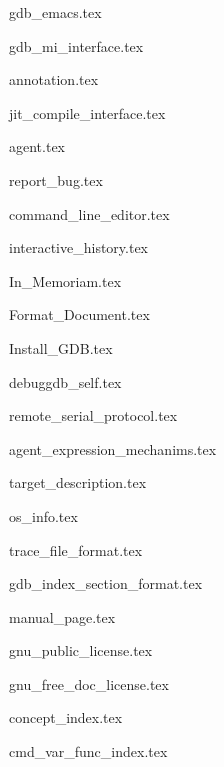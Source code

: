 \documentclass[12pt,twoside,a4paper,openright]{book}
\begin{document}
\begin{CJK}{UTF8}{gbsn}
{gdb_emacs.tex}

{gdb_mi_interface.tex}

{annotation.tex}

{jit_compile_interface.tex}

{agent.tex}

{report_bug.tex}

{command_line_editor.tex}

{interactive_history.tex}

\appendix

\renewcommand{\thechapter}{A\alph{chapter}}
{In_Memoriam.tex}

\renewcommand{\thechapter}{B\alph{chapter}}
{Format_Document.tex}

\renewcommand{\thechapter}{C\alph{chapter}}
{Install_GDB.tex}

\renewcommand{\thechapter}{D\alph{chapter}}
{debuggdb_self.tex}

\renewcommand{\thechapter}{E\alph{chapter}}
{remote_serial_protocol.tex}

\renewcommand{\thechapter}{F\alph{chapter}}
{agent_expression_mechanims.tex}

\renewcommand{\thechapter}{G\alph{chapter}}
{target_description.tex}

\renewcommand{\thechapter}{H\alph{chapter}}
{os_info.tex}

\renewcommand{\thechapter}{I\alph{chapter}}
{trace_file_format.tex}

\renewcommand{\thechapter}{J\alph{chapter}}
{gdb_index_section_format.tex}

\renewcommand{\thechapter}{K\alph{chapter}}
{manual_page.tex}

\renewcommand{\thechapter}{L\alph{chapter}}
{gnu_public_license.tex}

\renewcommand{\thechapter}{M\alph{chapter}}
{gnu_free_doc_license.tex}

{concept_index.tex}

{cmd_var_func_index.tex}

\cleardoublepage
\end{CJK}
\end{document}
